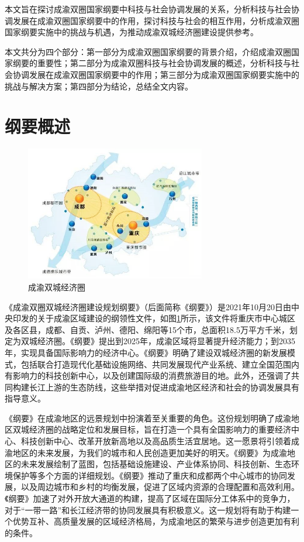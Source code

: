 \documentclass{CjC}
\begin{document}
本文旨在探讨成渝双圈国家纲要中科技与社会协调发展的关系，分析科技与社会协调发展在成渝双圈国家纲要中的作用，探讨科技与社会的相互作用，分析成渝双圈国家纲要实施中的挑战与机遇，为推动成渝双城经济圈建设提供参考。

本文共分为四个部分：第一部分为成渝双圈国家纲要的背景介绍，介绍成渝双圈国家纲要的重要性；第二部分为成渝双圈科技与社会协调发展的概述，分析科技与社会协调发展在成渝双圈国家纲要中的作用；第三部分为成渝双圈国家纲要实施中的挑战与解决方案；第四部分为结论，总结全文内容。

\section{纲要概述}

\begin{figure}[h]
\centering
\includegraphics[width=0.7\textwidth]{pics/成渝双城经济圈.png}
\caption{成渝双城经济圈}
\label{fig:map}
\end{figure}

《成渝双圈双城经济圈建设规划纲要》（后面简称《纲要》）是2021年10月20日由中央印发的关于成渝区域建设的纲领性文件，如图\ref{fig:map}所示，该文件将重庆市中心城区及各区县，成都、自贡、泸州、德阳、绵阳等15个市，总面积18.5万平方千米，划定为双城经济圈。《纲要》提出到2025年，成渝区域将显著提升经济能力；到2035年，实现具备国际影响力的经济中心。《纲要》明确了建设双城经济圈的新发展模式，包括联合打造现代化基础设施网络、共同发展现代产业系统、建立全国范围内有影响力的科技创新中心，以及创建国际级的消费旅游目的地。此外，还强调了共同构建长江上游的生态防线，这些举措对促进成渝地区经济和社会的协调发展具有指导意义。

《纲要》在成渝地区的远景规划中扮演着至关重要的角色。这份规划明确了成渝地区双城经济圈的战略定位和发展目标，旨在打造一个具有全国影响力的重要经济中心、科技创新中心、改革开放新高地以及高品质生活宜居地。这一愿景将引领着成渝地区的未来发展，为我们的城市和人民创造更加美好的明天。《纲要》为成渝地区的未来发展绘制了蓝图，包括基础设施建设、产业体系协同、科技创新、生态环境保护等多个方面的详细规划。《纲要》推动了重庆和成都两个中心城市的协同发展，以及周边城市和乡村的均衡发展，促进了区域内资源的合理配置和高效利用。《纲要》加速了对外开放大通道的构建，提高了区域在国际分工体系中的竞争力，对于“一带一路”和长江经济带的协同发展具有积极意义。这一规划将有助于构建一个优势互补、高质量发展的区域经济格局，为成渝地区的繁荣与进步创造更加有利的条件。
\end{document}
